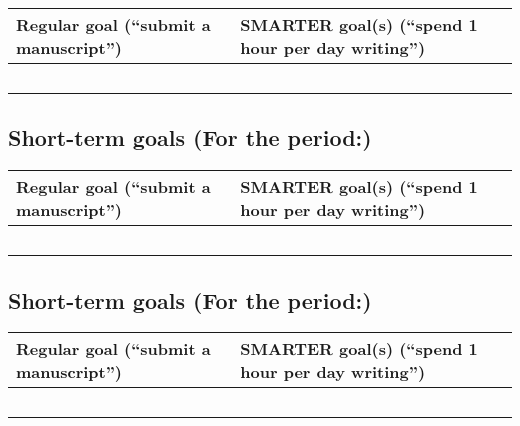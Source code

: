 \documentclass[letterpaper,oneside,11pt,article, portrait]{memoir}
\begin{document}
\begin{center}
 \begin{tabular}{|p{2.5in}|p{4in}|}
Regular goal (``submit a manuscript'')& SMARTER goal(s) (``spend 1 hour per day writing'') \\
\hline
\vspace{8in} \ & \\
\hline
\end{tabular}
\end{center}

\clearpage



\subsection{Short-term goals (For the period:\hspace{3in})}

\begin{center}
 \begin{tabular}{|p{2.5in}|p{4in}|}
Regular goal (``submit a manuscript'')& SMARTER goal(s) (``spend 1 hour per day writing'') \\
\hline
\vspace{8in} \ & \\
\hline
\end{tabular}
\end{center}

\clearpage




\subsection{Short-term goals (For the period:\hspace{3in})}

\begin{center}
 \begin{tabular}{|p{2.5in}|p{4in}|}
Regular goal (``submit a manuscript'')& SMARTER goal(s) (``spend 1 hour per day writing'') \\
\hline
\vspace{8in} \ & \\
\hline
\end{tabular}
\end{center}

\clearpage
\end{document}
